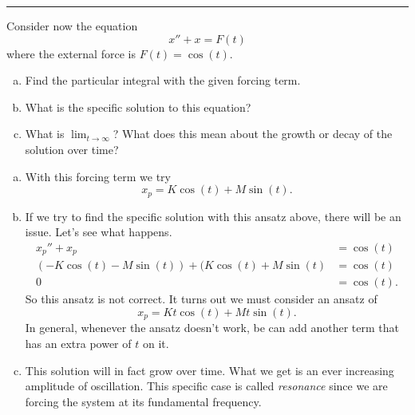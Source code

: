 \documentclass[12pt]{article} %
\begin{document}
\hrule
\begin{problem}
Consider now the equation
\[
x''+x=F(t)
\]
where the external force is $F(t)=\cos(t)$.
\begin{enumerate}[(a)]
    \item Find the particular integral with the given forcing term.
    \item What is the specific solution to this equation?
    \item What is $\lim_{t\to \infty}$? What does this mean about the growth or decay of the solution over time?
\end{enumerate}
\end{problem}
\begin{solution}
\begin{enumerate}[(a)]
    \item With this forcing term we try 
    \[
    x_p = K \cos(t)+M\sin(t).
    \]
    \item If we try to find the specific solution with this ansatz above, there will be an issue.  Let's see what happens.  
    \begin{align*}
        x_p''+x_p &= \cos(t)\\
        (-K\cos(t)-M\sin(t))+(K\cos(t)+M\sin(t)&=\cos(t)\\
        0&=\cos(t).
    \end{align*}
    So this ansatz is not correct.  It turns out we must consider an ansatz of
    \[
    x_p=Kt\cos(t)+Mt\sin(t).
    \]
    In general, whenever the ansatz doesn't work, be can add another term that has an extra power of $t$ on it.
    \item This solution will in fact grow over time.  What we get is an ever increasing amplitude of oscillation. This specific case is called \emph{resonance} since we are forcing the system at its fundamental frequency.
\end{enumerate}
\end{solution}
\end{document}
